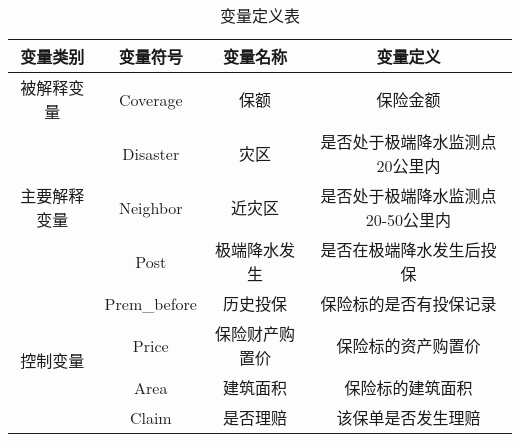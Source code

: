 \begin{table}[H]
    \caption{变量定义表}\label{tab:var}
    \begin{tabular}{@{}cccc@{}}
        \toprule
        变量类别                    & 变量符号        & 变量名称    & 变量定义              \\ \midrule
        被解释变量                   & Coverage    & 保额      & 保险金额    \\ \midrule
        \multirow{3}{*}{主要解释变量} & Disaster    & 灾区      & 是否处于极端降水监测点20公里内    \\ \cmidrule(l){2-4}
                                & Neighbor    & 近灾区     & 是否处于极端降水监测点20-50公里内 \\ \cmidrule(l){2-4}
                                & Post        & 极端降水发生    &  是否在极端降水发生后投保                 \\ \midrule
        \multirow{4}{*}{控制变量}   & Prem\_before & 历史投保    & 保险标的是否有投保记录        \\ \cmidrule(l){2-4}
                                & Price       & 保险财产购置价 & 保险标的资产购置价            \\ \cmidrule(l){2-4}
                                & Area        & 建筑面积    & 保险标的建筑面积                  \\ \cmidrule(l){2-4}
                                & Claim       & 是否理赔    & 该保单是否发生理赔            \\ \bottomrule
    \end{tabular}
\end{table}
